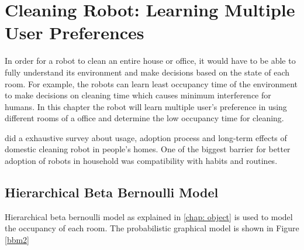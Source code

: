 \chapter{Cleaning Robot: Learning Multiple User Preferences}

In order for a robot to clean an entire house or office, it would have to be able to fully understand its environment and make decisions based on the state of each room. For example, the robots can learn least occupancy time of the environment to make decisions on cleaning time which causes minimum interference for humans. In this chapter the robot will learn multiple user's preference in using different rooms of a office and determine the low occupancy time for cleaning.

\cite{Fink2013} did a exhaustive survey about usage, adoption process and long-term effects of domestic cleaning robot in people's homes. One of the biggest barrier for better adoption of robots in household was compatibility with habits and routines. 


\section{Hierarchical Beta Bernoulli Model}

Hierarchical beta bernoulli model as explained in \ref{chap: object} is used to model the occupancy of each room. The probabilistic graphical model is shown in Figure \ref{bbm2}

